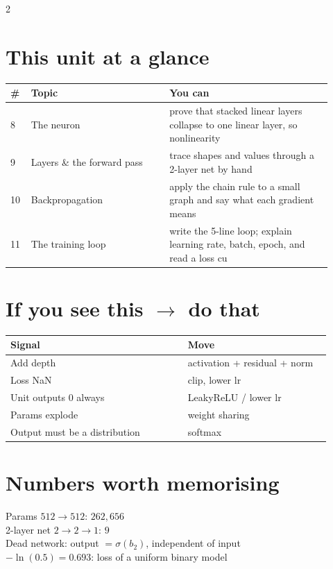 \documentclass[11pt,a4paper]{article}
\newcommand{\sect}[1]{\section*{#1}}
\begin{document}
\begin{multicols}{2}
\sect{This unit at a glance}
\begin{tabular}{@{}p{0.05\linewidth}p{0.40\linewidth}p{0.47\linewidth}@{}}
\toprule
\# & Topic & You can\\
\midrule
8 & The neuron & prove that stacked linear layers collapse to one linear layer, so nonlinearity\\
9 & Layers \& the forward pass & trace shapes and values through a 2-layer net by hand\\
10 & Backpropagation & apply the chain rule to a small graph and say what each gradient means\\
11 & The training loop & write the 5-line loop; explain learning rate, batch, epoch, and read a loss cu\\
\bottomrule
\end{tabular}

\sect{If you see this $\rightarrow$ do that}
\begin{tabular}{@{}p{0.52\linewidth}p{0.42\linewidth}@{}}
\toprule
Signal & Move\\
\midrule
Add depth & activation + residual + norm\\
Loss NaN & clip, lower lr\\
Unit outputs 0 always & LeakyReLU / lower lr\\
Params explode & weight sharing\\
Output must be a distribution & softmax\\
\bottomrule
\end{tabular}


\sect{Numbers worth memorising}
Params $512\to512$: $262{,}656$\\
2-layer net $2\to2\to1$: $9$\\
Dead network: output $=\sigma(b_2)$, independent of input\\
$-\ln(0.5)=0.693$: loss of a uniform binary model

\end{multicols}
\end{document}
